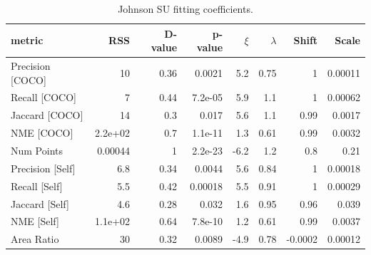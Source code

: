 \documentclass[12pt]{article}
\begin{document}
\begin{table}[ht]
\centering
\begin{tabular}{lrrrrrrr}
\hline
 metric           &      RSS &   D-value &   p-value &   $\xi$ &   $\lambda$ &   Shift &   Scale \\
\hline
 Precision [COCO] & 10       &      0.36 &   0.0021  &  5.2 &     0.75 &  1      & 0.00011 \\
 Recall [COCO]    &  7       &      0.44 &   7.2e-05 &  5.9 &     1.1  &  1      & 0.00062 \\
 Jaccard [COCO]   & 14       &      0.3  &   0.017   &  5.6 &     1.1  &  0.99   & 0.0017  \\
 NME [COCO]       &  2.2e+02 &      0.7  &   1.1e-11 &  1.3 &     0.61 &  0.99   & 0.0032  \\
 Num Points       &  0.00044 &      1    &   2.2e-23 & -6.2 &     1.2  &  0.8    & 0.21    \\
 Precision [Self] &  6.8     &      0.34 &   0.0044  &  5.6 &     0.84 &  1      & 0.00018 \\
 Recall [Self]    &  5.5     &      0.42 &   0.00018 &  5.5 &     0.91 &  1      & 0.00029 \\
 Jaccard [Self]   &  4.6     &      0.28 &   0.032   &  1.6 &     0.95 &  0.96   & 0.039   \\
 NME [Self]       &  1.1e+02 &      0.64 &   7.8e-10 &  1.2 &     0.61 &  0.99   & 0.0037  \\
 Area Ratio       & 30       &      0.32 &   0.0089  & -4.9 &     0.78 & -0.0002 & 0.00012 \\
\hline
\end{tabular}
\caption{Johnson SU fitting coefficients.}
\label{jsu_tbl}
\end{table}
\end{document}
